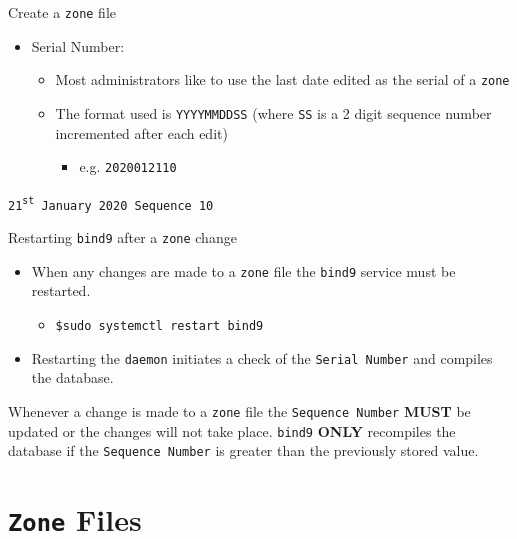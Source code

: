 \documentclass[aspectratio=169,xcolor=table]{beamer}
\begin{document}
\begin{frame}{Create a \texttt{zone} file}
  \begin{itemize}
    \item Serial Number:
      \begin{itemize}
        \item Most administrators like to use the last date edited as the serial of a \texttt{zone}
        \item The format used is \texttt{YYYYMMDDSS} (where \texttt{SS} is a 2 digit sequence number incremented after each edit)
          \begin{itemize}
            \item e.g. \texttt{2020012110}
          \end{itemize}
      \end{itemize}
  \end{itemize}
  \begin{tcolorbox}
    \begin{center}
      \texttt{21\textsuperscript{st} January 2020 Sequence 10}
    \end{center}
  \end{tcolorbox}
\end{frame}

\begin{frame}{Restarting \texttt{bind9} after a \texttt{zone} change}
  \begin{itemize}
    \item When any changes are made to a \texttt{zone} file the \texttt{bind9} service must be restarted.
      \begin{itemize}
        \item \texttt{\$sudo systemctl restart bind9}
      \end{itemize}
    \item Restarting the \texttt{daemon} initiates a check of the \texttt{Serial Number} and compiles the database.
  \end{itemize}
  \begin{tcolorbox}[title={\textbf{NOTE:}}]
    Whenever a change is made to a \texttt{zone} file the \texttt{Sequence Number} \textbf{MUST} be updated or the changes will not take place. \texttt{bind9} \textbf{ONLY} recompiles the database if the \texttt{Sequence Number} is greater than the previously stored value.
  \end{tcolorbox}
\end{frame}

\section{\texttt{Zone} Files}
\end{document}

